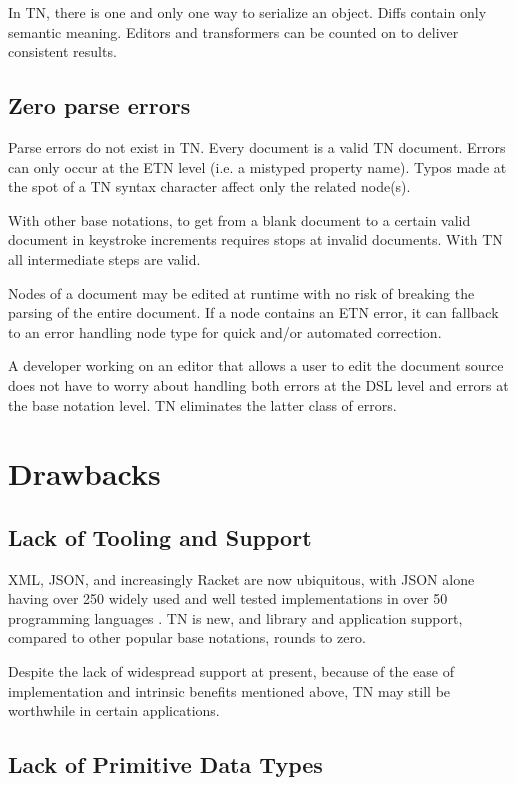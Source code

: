 \documentclass[journal]{IEEEtran}
\begin{document}
In TN, there is one and only one way to serialize an object. Diffs contain only semantic meaning. Editors and transformers can be counted on to deliver consistent results.

\subsection{Zero parse errors}

Parse errors do not exist in TN. Every document is a valid TN document. Errors can only occur at the ETN level (i.e. a mistyped property name). Typos made at the spot of a TN syntax character affect only the related node(s).

With other base notations, to get from a blank document to a certain valid document in keystroke increments requires stops at invalid documents. With TN all intermediate steps are valid.

Nodes of a document may be edited at runtime with no risk of breaking the parsing of the entire document. If a node contains an ETN error, it can fallback to an error handling node type for quick and/or automated correction.

A developer working on an editor that allows a user to edit the document source does not have to worry about handling both errors at the DSL level and errors at the base notation level. TN eliminates the latter class of errors.

\section{Drawbacks}

\subsection{Lack of Tooling and Support}

XML, JSON, and increasingly Racket are now ubiquitous, with JSON alone having over 250 widely used and well tested implementations in over 50 programming languages \cite{JSON}. TN is new, and library and application support, compared to other popular base notations, rounds to zero.

Despite the lack of widespread support at present, because of the ease of implementation and intrinsic benefits mentioned above, TN may still be worthwhile in certain applications.

\subsection{Lack of Primitive Data Types}
\end{document}
